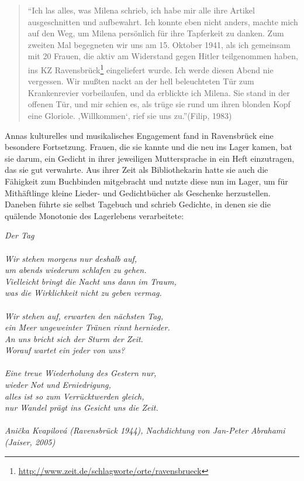 \documentclass[a4paper,
fontsize=11pt,
oneside,
numbers=noperiodatend,
parskip=half-,
bibliography=totoc,
final
]{scrartcl}
\begin{document}
\begin{quote}
\enquote{Ich las alles, was Milena schrieb, ich habe mir alle ihre
Artikel ausgeschnitten und aufbewahrt. Ich konnte eben nicht anders,
machte mich auf den Weg, um Milena persönlich für ihre Tapferkeit zu
danken. Zum zweiten Mal begegneten wir uns am 15. Oktober 1941, als ich
gemeinsam mit 20 Frauen, die aktiv am Widerstand gegen Hitler
teilgenommen haben, ins KZ Ravensbrück\footnote{\url{http://www.zeit.de/schlagworte/orte/ravensbrueck}}
eingeliefert wurde. Ich werde diesen Abend nie vergessen. Wir mußten
nackt an der hell beleuchteten Tür zum Krankenrevier vorbeilaufen, und
da erblickte ich Milena. Sie stand in der offenen Tür, und mir schien
es, als trüge sie rund um ihren blonden Kopf eine Gloriole.
,Willkommen`, rief sie uns zu.}(Filip, 1983)
\end{quote}

Annas kulturelles und musikalisches Engagement fand in Ravensbrück eine
besondere Fortsetzung. Frauen, die sie kannte und die neu ins Lager
kamen, bat sie darum, ein Gedicht in ihrer jeweiligen Muttersprache in
ein Heft einzutragen, das sie gut verwahrte. Aus ihrer Zeit als
Bibliothekarin hatte sie auch die Fähigkeit zum Buchbinden mitgebracht
und nutzte diese nun im Lager, um für Mithäftlinge kleine Lieder- und
Gedichtbücher als Geschenke herzustellen. Daneben führte sie selbst
Tagebuch und schrieb Gedichte, in denen sie die quälende Monotonie des
Lagerlebens verarbeitete:~

\emph{Der Tag\\\\ Wir stehen morgens nur deshalb auf,\\ um abends
wiederum schlafen zu gehen.\\ Vielleicht bringt die Nacht uns dann im
Traum,\\ was die Wirklichkeit nicht zu geben vermag.\\\\ Wir stehen auf,
erwarten den nächsten Tag,\\ ein Meer ungeweinter Tränen rinnt
hernieder.\\ An uns bricht sich der Sturm der Zeit.\\ Worauf wartet ein
jeder von uns?\\\\ Eine treue Wiederholung des Gestern nur,\\ wieder Not
und Erniedrigung,\\ alles ist so zum Verrücktwerden gleich,\\ nur Wandel
prägt ins Gesicht uns die Zeit.\\\\Anička Kvapilová (Ravensbrück 1944),
Nachdichtung von Jan-Peter Abrahami~ (Jaiser, 2005)}
\end{document}
